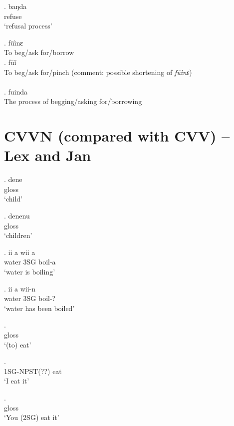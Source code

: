 \documentclass{assets/fieldnotes}
\begin{document}
\ex. baŋda\\
refuse\\
`refusal process'

\exg. fūìnɛ\\
To beg/ask for/borrow\\

\exg. fūĩ\\
To beg/ask for/pinch (comment: possible shortening of \textit{fūìnɛ})\\

\\

\exg. fuinda\\
The process of begging/asking for/borrowing\\



\section{CVVN (compared with CVV) -- Lex and Jan}


\exg. dene \\
gloss \\
`child'

\exg. denenu \\
gloss \\
`children'


\exg. ii a wii a \\ %
water 3SG boil-a \\
`water is boiling' %

\exg. ii a wii-n \\
water 3SG boil-? \\
`water has been boiled'


\exg.  \\
gloss \\
`(to) eat'

\exg.  \\
1SG-NPST(??) eat \\
`I eat it'

\exg.  \\
gloss \\
`You (2SG) eat it'
\end{document}
